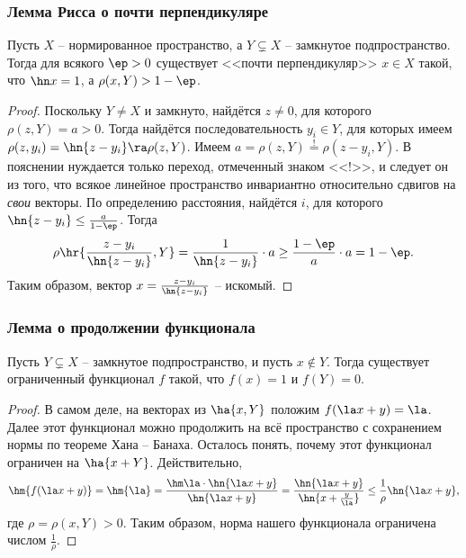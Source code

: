 \documentclass[a4paper]{article}
\begin{document}
\subsubsection{Лемма Рисса о почти перпендикуляре}

\begin{lemma}
Пусть $X$ -- нормированное пространство, а $Y \subsetneq X$ -- замкнутое подпространство.
Тогда для всякого $\ep > 0$ существует <<почти перпендикуляр>> $x \in X$ такой,
что $\hn x = 1$, а $\rho(x,Y) > 1-\ep$.
\end{lemma}
\begin{proof}
Поскольку $Y \neq X$ и замкнуто, найдётся $z \neq 0$, для которого $\rho(z, Y) = a > 0$.
Тогда найдётся последовательность $y_i \in Y$, для которых имеем $\rho(z,y_i) = \hn{z-y_i} \ra \rho(z,Y)$.
Имеем $a = \rho(z,Y) \stackrel{!}{=} \rho(z-y_i, Y)$. В пояснении нуждается только переход,
отмеченный знаком <<!>>, и следует он из того, что всякое линейное пространство инвариантно относительно
сдвигов на \emph{свои} векторы. По определению расстояния, найдётся $i$, для которого $\hn{z - y_i} \le \frac{a}{1-\ep}$.
Тогда
$$\rho\hr{\frac{z-y_i}{\hn{z-y_i}}, Y} = \frac{1}{\hn{z-y_i}}\cdot a \ge \frac{1-\ep}{a}\cdot a = 1-\ep.$$
Таким образом, вектор $x = \frac{z-y_i}{\hn{z-y_i}}$ -- искомый.
\end{proof}


\subsubsection{Лемма о продолжении функционала}

\begin{lemma}\label{lem:func.extension}
Пусть $Y \subsetneq  X$ -- замкнутое подпространство, и пусть $x \notin Y$. Тогда существует
ограниченный функционал $f$ такой, что $f(x) = 1$ и $f(Y) = 0$.
\end{lemma}
\begin{proof}
В самом деле, на векторах из $\ha{x, Y}$ положим $f(\la x + y) = \la$. Далее этот функционал можно продолжить
на всё пространство с сохранением нормы по теореме Хана -- Банаха. Осталось понять, почему этот функционал
ограничен на $\ha{x + Y}$. Действительно,
$$\hm{f(\la x + y)} = \hm{\la} = \frac{\hm\la \cdot \hn{\la x + y}}{\hn{\la x + y}} =
\frac{\hn{\la x + y}}{\hn{x + \frac{y}{\la}}} \le \frac{1}{\rho}\hn{\la x + y},$$
где $\rho = \rho(x, Y) > 0$. Таким образом, норма нашего функционала ограничена числом $\frac1\rho$.
\end{proof}
\end{document}
